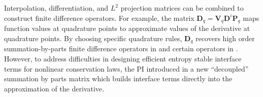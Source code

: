 \documentclass[review]{siamart0216}
\theoremstyle{assumption}
\begin{document}
Interpolation, differentiation, and $L^2$ projection matrices can be combined to construct finite difference operators.  For example, the matrix $\bm{D}_q = \bm{V}_q\bm{D}^i\bm{P}_q$ maps function values at quadrature points to approximate values of the derivative at quadrature points.  By choosing specific quadrature rules, $\bm{D}_q$ recovers high order summation-by-parts finite difference operators in \cite{gassner2013skew, fernandez2014generalized, ranocha2018generalised} and certain operators in \cite{hicken2016multidimensional}.  However, to address difficulties in designing efficient entropy stable interface terms for nonlinear conservation laws, the PI introduced in \cite{chan2017discretely} a new ``decoupled'' summation by parts matrix which builds interface terms directly into the approximation of the derivative.  
\end{document}
